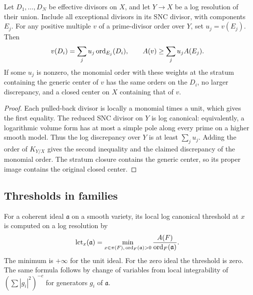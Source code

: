 \begin{lemma}\label{lem:retraction}
Let $D_1,\ldots,D_N$ be effective divisors on $X$, and let $Y\to X$
be a log resolution of their union. Include all exceptional divisors
in its SNC divisor, with components $E_j$. For any positive multiple
$v$ of a prime-divisor order over $Y$, set $u_j=v(E_j)$. Then
\begin{equation}\label{eq:retraction}
 v(D_i)=\sum_j u_j\operatorname{ord}_{E_j}(D_i),\qquad
 A(v)\geq\sum_j u_jA(E_j).
\end{equation}
If some $u_j$ is nonzero, the monomial order with these weights at the
stratum containing the generic center of $v$ has the same orders on
the $D_i$, no larger discrepancy, and a closed center on $X$
containing that of $v$.
\end{lemma}
\begin{proof}
Each pulled-back divisor is locally a monomial times a unit, which
gives the first equality. The reduced SNC divisor on $Y$ is log
canonical: equivalently, a logarithmic volume form has at most a
simple pole along every prime on a higher smooth model. Thus the
log discrepancy over $Y$ is at least $\sum_j u_j$. Adding the order of
$K_{Y/X}$ gives the second inequality and the claimed discrepancy
of the monomial order. The stratum closure contains the generic
center, so its proper image contains the original closed center.
\end{proof}

\subsection{Thresholds in families}
For a coherent ideal $\mathfrak a$ on a smooth variety, its local log
canonical threshold at $x$ is computed on a log resolution by
\begin{equation}\label{eq:lct-formula}
 \operatorname{lct}_x(\mathfrak a)=
 \min_{x\in\pi(F),\,\operatorname{ord}_F(\mathfrak a)>0}
       \frac{A(F)}{\operatorname{ord}_F(\mathfrak a)}.
\end{equation}
The minimum is $+\infty$ for the unit ideal. For the zero ideal the
threshold is zero. The same formula follows by change of variables
from local integrability of
$(\sum |g_i|^2)^{-c}$ for generators $g_i$ of $\mathfrak a$.

